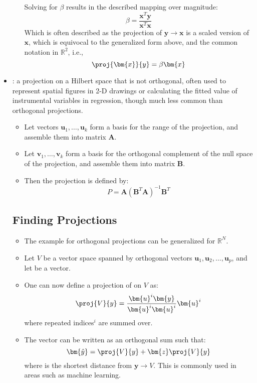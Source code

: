\begin{itemize}
\begin{itemize}
      Solving for \(\beta \) results in the described mapping over magnitude:
      \[%
      \beta = \frac{\bm{x}^T \bm{y}}{\bm{x}^T \bm{x}}
      \]%
      Which is often described as the projection of \(\bm{y} \to \bm{x}\) is a scaled version of \(\bm{x}\), which is equivocal to the generalized form above, and the common notation in \(\mathbb{R}^2\), i.e.,
      \[%
      \proj{\bm{x}}{y} = \beta \bm{x}
      \]%
    \end{itemize}
  \item {}: a projection on a Hilbert space that is not orthogonal, often used to represent spatial figures in 2-D drawings or calculating the fitted value of instrumental variables in regression, though much less common than orthogonal projections. 
    \begin{itemize}
      \item Let vectors \(\bm{u}_1,\ldots,\bm{u}_k\) form a basis for the range of the projection, and assemble them into matrix \(\bm{A}\). 
      \item Let \(\bm{v}_1,\ldots,\bm{v}_k\) form a basis for the orthogonal complement of the null space of the projection, and assemble them into matrix \(\bm{B}\).
      \item Then the projection is defined by:
      \[%
      P = \bm{A}(\bm{B}^T \bm{A})^{-1} \bm{B}^T
      \]%
    \end{itemize}
  
  \subsection{Finding Projections}\label{}
  \begin{itemize}
    \item The example for orthogonal projections can be generalized for \(\mathbb{R}^N\). 
    \item Let \(V\) be a vector space spanned by orthogonal vectors \(\bm{u}_1,\bm{u}_2,\ldots,\bm{u}_p\), and let  be a vector.
    \item One can now define a projection of  on \(V\) as:
    \[%
    \proj{V}{y}=\frac{\bm{u}^i \bm{y}}{\bm{u}^i \bm{u}^i} \bm{u}^i
    \]%
    where repeated indices\(^i\) are summed over.
    \item The vector  can be written as an orthogonal sum such that:
    \[%
    \bm{\hat{y}} = \proj{V}{y} + \bm{z} \proj{V}{y}
    \]%
    where  is the shortest distance from \(\bm{y} \to V\). This is commonly used in areas such as machine learning.
  \end{itemize}
  
\end{itemize}


